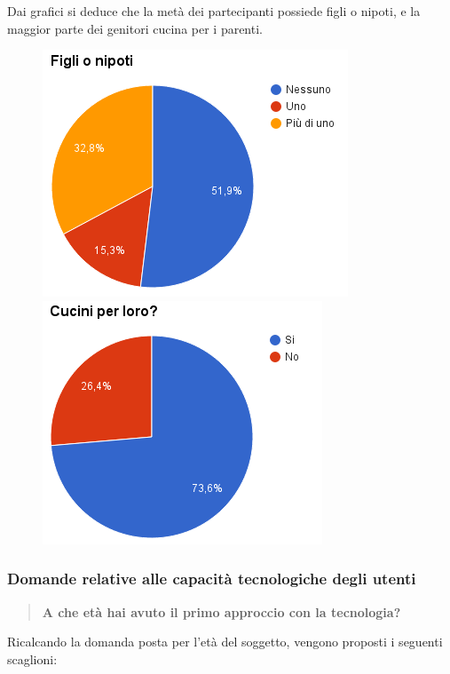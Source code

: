 Dai grafici si deduce che la metà dei partecipanti possiede figli o nipoti, e
la maggior parte dei genitori cucina per i parenti.
\begin{figure}[H]
\centering
\begin{minipage}{.48\textwidth}
	\includegraphics[scale=0.57]{img/chart_hai_figli_o_nipoti}
\end{minipage}
\hfill
\begin{minipage}{.49\textwidth}
	\includegraphics[scale=0.57]{img/chart_cucini_per_i_parenti}
\end{minipage}
\end{figure}

\subsubsection{Domande relative alle capacità tecnologiche degli utenti}
\begin{quote}
	\textbf{A che età hai avuto il primo approccio con la tecnologia?}
\end{quote}

Ricalcando la domanda posta per l'età del soggetto, vengono proposti i seguenti
scaglioni:

